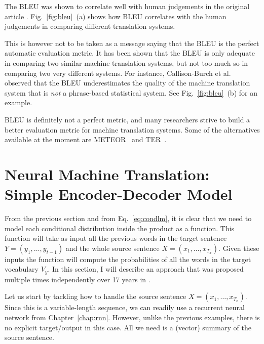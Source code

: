 \documentclass{report}
\begin{document}
The BLEU was shown to correlate well with human judgements in the original
article \cite{papineni2002bleu}. Fig.~\ref{fig:bleu}~(a) shows how BLEU correlates
with the human judgements in comparing different translation systems.

This is however not to be taken as a message saying that the BLEU is the perfect
automatic evaluation metric. It has been shown that the BLEU is only adequate in
comparing two similar machine translation systems, but not too much so in
comparing two very different systems. For instance, Callison-Burch et
al.~\cite{callison2006re} observed that the BLEU underestimates the quality of
the machine translation system that is {\em not} a phrase-based statistical
system. See Fig.~\ref{fig:bleu}~(b) for an example.

BLEU is definitely not a perfect metric, and many researchers strive to build a
better evaluation metric for machine translation systems. Some of the
alternatives available at the moment are
METEOR~\cite{denkowski:lavie:meteor-wmt:2014} and TER~\cite{snover2006study}.

\section{Neural Machine Translation: \\ Simple Encoder-Decoder Model}
\label{sec:nmt_simple}

From the previous section and  from Eq.~\ref{eq:condlm}, it is clear that we
need to model each conditional distribution inside the product as a function.
This function will take as input all the previous words in the target sentence
$Y=(y_1, \ldots, y_{t-1})$ and the whole source sentence $X=(x_1, \ldots, x_{T_x})$.
Given these inputs the function will compute the probabilities of all the words
in the target vocabulary $V_y$. In this section, I will describe an approach
that was proposed multiple times independently over 17 years in
\cite{forcada1997recursive,cho2014learning,sutskever2014sequence}.

Let us start by tackling how to handle the source sentence $X=(x_1, \ldots,
x_{T_x})$. Since this is a variable-length sequence, we can readily use a
recurrent neural network from Chapter~\ref{chap:rnn}. However, unlike the
previous examples, there is no explicit target/output in this case. All we need
is a (vector) summary of the source sentence.
\end{document}
